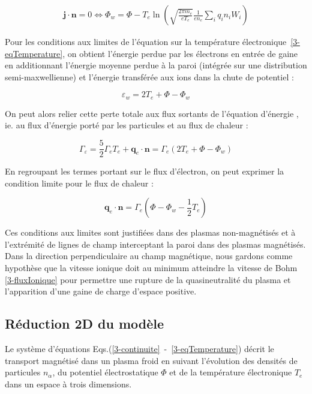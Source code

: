 \begin{refsection}
\begin{equation}\begin{split}
\mathbf j\cdot\mathbf{n}=0\Leftrightarrow
\Phi_w=\Phi-T_e\ln\left(\sqrt{\frac{2\pi
m_e}{eT_e}}\frac{1}{en_e}\sum_iq_in_iW_i\right)
\end{split}\end{equation}

Pour les conditions aux limites de l'équation sur la température
électronique~\eqref{3-eqTemperature}, on obtient l'énergie perdue par les
électrons en entrée de gaine en additionnant l'énergie moyenne perdue à la paroi (intégrée sur une distribution semi-maxwellienne) et l'énergie transférée aux ions dans la chute de potentiel :

\begin{equation}
	\varepsilon_w=2T_e+\Phi-\Phi_w
\end{equation}
 
 On peut alors relier cette perte totale aux flux sortants de l'équation
 d'énergie , ie. au flux d'énergie porté
 par les particules et au flux de chaleur :
 
\begin{equation}
\Gamma_\varepsilon=\frac{5}{2}{\Gamma}_eT_e+\mathbf{q}_e\cdot\mathbf{n}=
\Gamma_e\left(2T_e+\Phi-\Phi_w\right)
\end{equation}

En regroupant les termes portant sur le flux d'électron, on peut exprimer la
condition limite pour le flux de chaleur :

\begin{equation}
\mathbf{q}_e\cdot\mathbf{n}=\Gamma_e\left(\Phi-\Phi_w-\frac{1}{2}T_e\right)
\end{equation}

Ces conditions aux limites sont justifiées dans des plasmas non-magnétisés et à l'extrémité
de lignes de champ interceptant la paroi dans des plasmas magnétisés. Dans la
direction perpendiculaire au champ magnétique, nous gardons comme hypothèse que
la vitesse ionique doit au minimum atteindre la vitesse de Bohm
\eqref{3-fluxIonique} pour permettre une rupture de la quasineutralité du
plasma et l'apparition d'une gaine de charge d'espace positive.


\subsection{Réduction 2D du modèle}

Le système d'équations Eqs.(\ref{3-continuite}~-~\ref{3-eqTemperature}) décrit le
transport magnétisé dans un plasma froid en suivant l'évolution des densités de
particules $n_\alpha$, du potentiel électrostatique $\Phi$ et de la
température électronique $T_e$ dans un espace à trois dimensions. 


\end{refsection}
